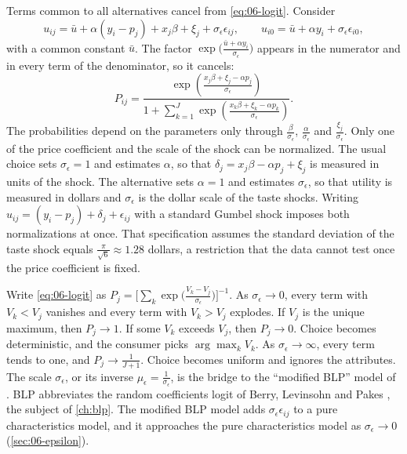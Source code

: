Terms common to all alternatives cancel from \eqref{eq:06-logit}. Consider
\begin{equation*}
u_{ij} = \bar u + \alpha(y_i - p_j) + x_j\beta + \xi_j + \sigma_\epsilon\epsilon_{ij}, \qquad
u_{i0} = \bar u + \alpha y_i + \sigma_\epsilon\epsilon_{i0},
\end{equation*}
with a common constant $\bar u$. The factor $\exp\big(\frac{\bar u + \alpha y_i}{\sigma_\epsilon}\big)$ appears in the
numerator and in every term of the denominator, so it cancels:
\begin{equation*}
P_{ij} = \frac{\exp\left(\frac{x_j\beta + \xi_j - \alpha p_j}{\sigma_\epsilon}\right)}
{1 + \sum_{k=1}^J\exp\left(\frac{x_k\beta + \xi_k - \alpha p_k}{\sigma_\epsilon}\right)} .
\end{equation*}
The probabilities depend on the parameters only through $\frac{\beta}{\sigma_\epsilon}$, $\frac{\alpha}{\sigma_\epsilon}$
and $\frac{\xi_j}{\sigma_\epsilon}$. Only one of the price coefficient and the scale of the shock can be normalized.
The usual choice sets $\sigma_\epsilon = 1$ and estimates $\alpha$, so that
$\delta_j = x_j\beta - \alpha p_j + \xi_j$ is measured in units of the shock. The alternative sets $\alpha = 1$
and estimates $\sigma_\epsilon$, so that utility is measured in dollars and $\sigma_\epsilon$ is the dollar scale of
the taste shocks. Writing $u_{ij} = (y_i - p_j) + \delta_j + \epsilon_{ij}$ with a standard Gumbel shock imposes
both normalizations at once. That specification assumes the standard deviation of the taste shock equals
$\frac{\pi}{\sqrt 6} \approx 1.28$ dollars, a restriction that the data cannot test once the price coefficient is fixed.

Write \eqref{eq:06-logit} as
$P_j = \Big[\sum_k \exp\Big(\frac{V_k - V_j}{\sigma_\epsilon}\Big)\Big]^{-1}$. As $\sigma_\epsilon \to 0$, every term
with $V_k < V_j$ vanishes and every term with $V_k > V_j$ explodes. If $V_j$ is the unique maximum, then
$P_j \to 1$. If some $V_k$ exceeds $V_j$, then $P_j \to 0$. Choice becomes deterministic, and the consumer picks
$\arg\max_k V_k$. As $\sigma_\epsilon \to \infty$, every term tends to one, and $P_j \to \frac{1}{J+1}$. Choice
becomes uniform and ignores the attributes. The scale $\sigma_\epsilon$, or its inverse
$\mu_\epsilon = \frac{1}{\sigma_\epsilon}$, is the bridge to the ``modified BLP'' model of \citet{BerryPakes2007}.
BLP abbreviates the random coefficients logit of Berry, Levinsohn and Pakes \citep{BerryLevinsohnPakes1995}, the
subject of \cref{ch:blp}. The modified BLP model adds $\sigma_\epsilon\epsilon_{ij}$ to a pure characteristics model, and it approaches the pure
characteristics model as $\sigma_\epsilon \to 0$ (\cref{sec:06-epsilon}).

